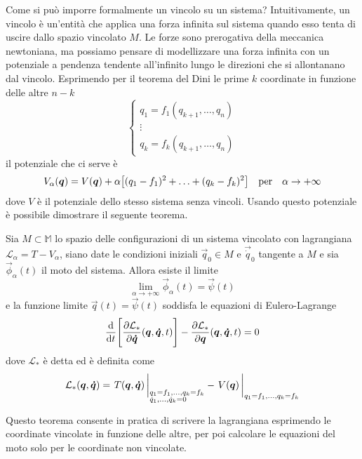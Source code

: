 Come si può imporre formalmente un vincolo su un sistema? Intuitivamente, un vincolo è un'entità che applica una forza infinita sul sistema quando esso tenta di uscire dallo spazio vincolato $M$. Le forze sono prerogativa della meccanica newtoniana, ma possiamo pensare di modellizzare una forza infinita con un potenziale a pendenza tendente all'infinito lungo le direzioni che si allontanano dal vincolo. Esprimendo per il teorema del Dini le prime $k$ coordinate in funzione delle altre $n-k$ \begin{equation}
\begin{cases}
  q_1 = f_1(q_{k+1}, \ldots, q_n) \\
  \vdots \\
  q_k = f_k(q_{k+1}, \ldots, q_n)
\end{cases}
\end{equation} 
il potenziale che ci serve è \begin{equation}
  V_{\alpha}(\vec{q}) = V(\vec{q}) + \alpha\big[(q_1-f_1)^2 + \ldots + (q_k-f_k)^2 \big] \qqtext{per} \alpha \to +\infty
\end{equation} 
dove $V$ è il potenziale dello stesso sistema senza vincoli. Usando questo potenziale è possibile dimostrare il seguente teorema.
\begin{theorem}
  Sia $M \subset \mathbb{M}$ lo spazio delle configurazioni di un sistema vincolato con lagrangiana $\mathcal{L}_{\alpha} = T -V_{\alpha}$, siano date le condizioni iniziali $\vec{q}_0 \in  M$ e $\vec{\dot{q}}_0$ tangente a $M$ e sia $\vec{\phi}_{\alpha}(t)$ il moto del sistema. Allora esiste il limite \begin{equation}
  \lim_{\alpha \to +\infty} \vec{\phi}_{\alpha}(t) = \vec{\psi}(t)
  \end{equation} 
  e la funzione limite $\vec{q}(t) = \vec{\psi}(t)$ soddisfa le equazioni di Eulero-Lagrange \begin{equation}
    \dv{t}\Bigg[\pdv{\mathcal{L}_{*}}{\boldsymbol{\dot{q}}}()(\boldsymbol{q},\boldsymbol{\dot{q}},t)\Bigg] - \pdv{\mathcal{L}_{*}}{\boldsymbol{q}}()(\boldsymbol{q},\boldsymbol{\dot{q}},t) = 0
  \end{equation} 
  dove $\mathcal{L}_*$ è detta  ed è definita come \begin{equation}
  \mathcal{L}_*(\vec{q},\vec{\dot{q}}) = \eval{T(\vec{q},\vec{\dot{q}})\,}_{\begin{subarray}{l}
    q_1=f_1, \ldots, q_k=f_k \\
    \dot{q}_1, \ldots, \dot{q}_k = 0
  \end{subarray}} - \eval{V(\vec{q})\,}_{q_1=f_1, \ldots, q_k=f_k}
  \end{equation} 
\end{theorem} 
Questo teorema consente in pratica di scrivere la lagrangiana esprimendo le coordinate vincolate in funzione delle altre, per poi calcolare le equazioni del moto solo per le coordinate non vincolate. 

